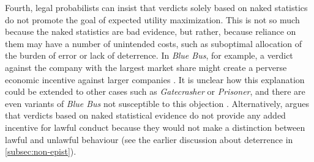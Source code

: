 \documentclass{article}
\begin{document}
 Fourth, legal probabilists can insist that verdicts solely based on naked statistics do not promote the goal of expected utility maximization. This is not so much because the naked statistics are bad evidence, but rather, because reliance on them may have a number of unintended costs, such as suboptimal allocation of the burden of error or lack of deterrence. 
 In \textit{Blue Bus}, for example, a verdict against the company with the largest market share might create a perverse economic incentive against larger companies \citep{Posner1973}. It is unclear how this explanation could be extended to other cases such as \textit{Gatecrasher} or \textit{Prisoner}, and there are even variants of \emph{Blue Bus} not susceptible to this objection \citep{wells1992naked}. 
 Alternatively, \cite{dahlmanNakedStat2020} argues
 that verdicts based on naked statistical evidence do not provide any added incentive for lawful conduct because they would not make a distinction between lawful and unlawful behaviour (see the earlier discussion about deterrence in \ref{subsec:non-epist}). 
\end{document}
